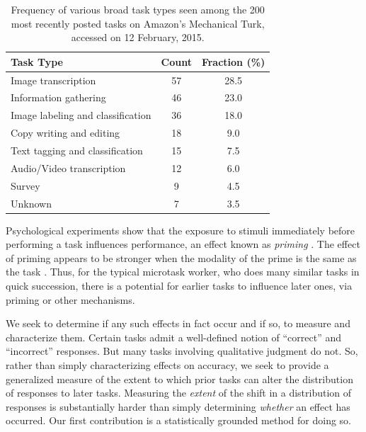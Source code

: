 \documentclass{sigchi}
\begin{document}
\begin{table}
\centering
\begin{tabular}{l c c}
\toprule
Task Type & Count & Fraction (\%) \\
\toprule
Image transcription & 57 & 28.5 \\
Information gathering & 46 & 23.0 \\
Image labeling and classification & 36 & 18.0 \\
Copy writing and editing & 18 & 9.0 \\
Text tagging and classification & 15 & 7.5 \\
Audio/Video transcription & 12 & 6.0 \\
Survey & 9 & 4.5 \\
Unknown & 7 & 3.5 \\
\bottomrule
\end{tabular}
\caption{
	Frequency of various broad task types seen among the 200 most 
	recently posted tasks on Amazon's Mechanical Turk, 
	accessed on 12 February, 2015.
}
\label{table:task_composition}
\end{table}


Psychological experiments show that the exposure to stimuli immediately 
before performing a task influences performance, an effect known as 
\textit{priming} 
\cite{Ghuman17062008,BJOP1826,beller1971priming,BJOP1796}.
The effect of priming appears to be stronger when the modality of the
prime is the same as the task \cite{BJOP1796}.
Thus, for the typical microtask worker, who does many similar tasks in
quick succession, there is a potential for earlier tasks to influence
later ones, via priming or other mechanisms.

We seek to determine if any such effects in fact occur and if so, 
to measure and characterize them.
Certain tasks admit a well-defined notion of ``correct'' and 
``incorrect'' responses.  But many tasks involving qualitative judgment
do not.  So, rather than simply characterizing effects on accuracy, we seek
to provide a generalized measure of the extent to which prior tasks
can alter the distribution of responses to later tasks.  
Measuring the \textit{extent} of the shift in a distribution of responses 
is substantially harder than simply determining \textit{whether} an effect 
has occurred.  Our first contribution is a statistically grounded method 
for doing so.
\end{document}
